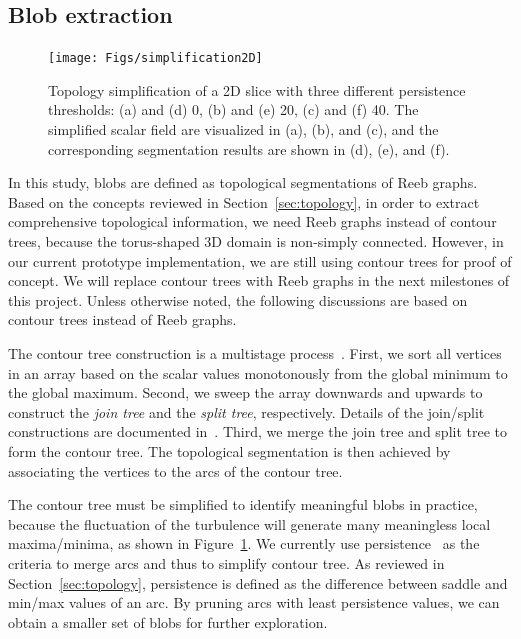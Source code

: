 \subsection{Blob extraction}


\begin{figure}[!h]
  \centering
  \texttt{[image: Figs/simplification2D]}
  \caption{Topology simplification of a 2D slice with three different persistence thresholds: (a) and (d) 0, (b) and (e) 20, (c) and (f) 40.  The simplified scalar field are visualized in (a), (b), and (c), and the corresponding segmentation results are shown in (d), (e), and (f).}
  \label{fig:simplification2D}
\end{figure}


In this study, blobs are defined as topological segmentations of Reeb graphs.  Based on the concepts reviewed in Section~\ref{sec:topology}, in order to extract comprehensive topological information, we need Reeb graphs instead of contour trees, because the torus-shaped 3D domain is non-simply connected.  However, in our current prototype implementation, we are still using contour trees for proof of concept.  We will replace contour trees with Reeb graphs in the next milestones of this project.  Unless otherwise noted, the following discussions are based on contour trees instead of Reeb graphs.  

The contour tree construction is a multistage process~\cite{CarrSA00}.  First, we sort all vertices in an array based on the scalar values monotonously from the global minimum to the global maximum.  Second, we sweep the array downwards and upwards to construct the \emph{join tree} and the \emph{split tree}, respectively.  Details of the join/split constructions are documented in~\cite{CarrSA00}.  Third, we merge the join tree and split tree to form the contour tree.  The topological segmentation is then achieved by associating the vertices to the arcs of the contour tree.  

The contour tree must be simplified to identify meaningful blobs in practice, because the fluctuation of the turbulence will generate many meaningless local maxima/minima, as shown in Figure~\ref{fig:simplification2D}.  We currently use persistence~\cite{EdelsbrunnerLZ02} as the criteria to merge arcs and thus to simplify contour tree.  As reviewed in Section~\ref{sec:topology}, persistence is defined as the difference between saddle and min/max values of an arc.  By pruning arcs with least persistence values, we can obtain a smaller set of blobs for further exploration.  

